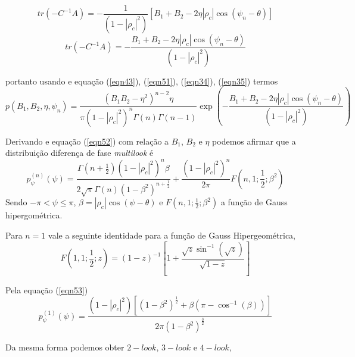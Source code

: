 {\footnotesize
\begin{equation}\label{eqn50}
	tr(-C^{-1}A)=-\frac{1}{(1-|\rho_c|^2)}\left[B_1+B_2-2\eta |\rho_c |\cos(\psi_n-\theta)\right]
\end{equation}}
{\footnotesize
\begin{equation}\label{eqn51}
	tr(-C^{-1}A)=-\frac{B_1+B_2-2\eta |\rho_c|\cos(\psi_n-\theta)}{(1-|\rho_c|^2)}
\end{equation}}

portanto usando e equação (\ref{eqn43}), (\ref{eqn51}),   (\ref{eqn34}), (\ref{eqn35}) termos   
{\footnotesize
\begin{equation}\label{eqn52}
	p(B_1,B_2,\eta,\psi_n)=\frac{\left(B_1B_2-\eta^2\right)^{n-2}\eta}{\pi(1-|\rho_c|^2)^{n}\Gamma(n)\Gamma(n-1)}\exp\left(-\frac{B_1+B_2-2\eta |\rho_c |\cos(\psi_n-\theta)}{(1-|\rho_c|^2)}\right)
\end{equation}}

Derivando e equação (\ref{eqn52}) com relação a $B_1$, $B_2$ e $\eta$ podemos afirmar que a distribuição diferença de fase {\it multilook} é 
\begin{equation}\label{eqn53}
	p_{\psi}^{(n)}(\psi)=\frac{\Gamma(n+\frac{1}{2})(1-|\rho_c|^2)^n\beta}{2\sqrt{\pi}\Gamma(n)(1-\beta^2)^{n+\frac{1}{2}}}+\frac{(1-|\rho_c|^2)^n}{2\pi}F(n,1;\frac{1}{2};\beta^2)
\end{equation}
Sendo $-\pi<\psi\leq\pi$, $\beta=|\rho_c|\cos(\psi-\theta)$ e $F(n,1;\frac{1}{2};\beta^2)$ a função de Gauss hipergométrica.

Para $n=1$  vale a seguinte identidade para a função de Gauss Hipergeométrica,
\begin{equation}\label{eqn54}
	F(1,1;\frac{1}{2};z)=(1-z)^{-1}\left[1+\frac{\sqrt{z}\sin^{-1}(\sqrt{z})}{\sqrt{1-z}}\right]
\end{equation}

Pela equação (\ref{eqn53})
\begin{equation}\label{eqn55}
	p_{\psi}^{(1)}(\psi)=\frac{(1-|\rho_c|^2)[(1-\beta^{2})^{\frac{1}{2}}+\beta(\pi-\cos^{-1}(\beta))]}{2\pi(1-\beta^{2})^{\frac{3}{2}}}
\end{equation}

Da mesma forma podemos obter $2-look$, $3-look$ e $4-look$,

